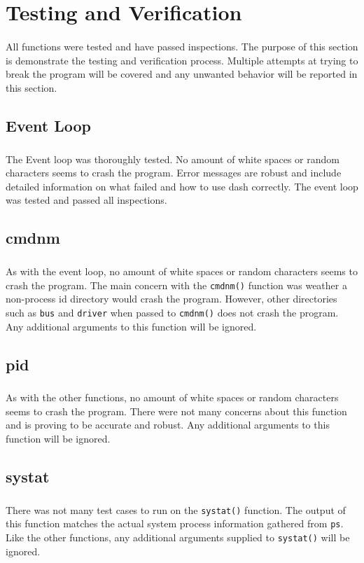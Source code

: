 \documentclass[10pt]{article}
\begin{document}
\section{Testing and Verification}
\paragraph{}
All functions were tested and have passed inspections. The purpose of this section is demonstrate the testing and verification process. Multiple attempts at trying to break the program will be covered and any unwanted behavior will be reported in this section.


\subsection{Event Loop}
\subparagraph{}
The Event loop was thoroughly tested. No amount of white spaces or random characters seems to crash the program. Error messages are robust and include detailed information on what failed and how to use dash correctly.  The event loop was tested and passed all inspections.

\subsection{cmdnm}
\subparagraph{}
As with the event loop, no amount of white spaces or random characters seems to crash the program. The main concern with the \texttt{cmdnm()} function was weather a non-process id directory would crash the program. However, other directories such as \texttt{bus} and \texttt{driver} when passed to \texttt{cmdnm()} does not crash the program. Any additional arguments to this function will be ignored.

\subsection{pid}
\subparagraph{}
As with the other functions, no amount of white spaces or random characters seems to crash the program. There were not many concerns about this function and is proving to be accurate and robust. Any additional arguments to this function will be ignored.

\subsection{systat}
\subparagraph{}
There was not many test cases to run on the \texttt{systat()} function. The output of this function matches the actual system process information gathered from \texttt{ps}. Like the other functions, any additional arguments supplied to \texttt{systat()} will be ignored. 
\end{document}
